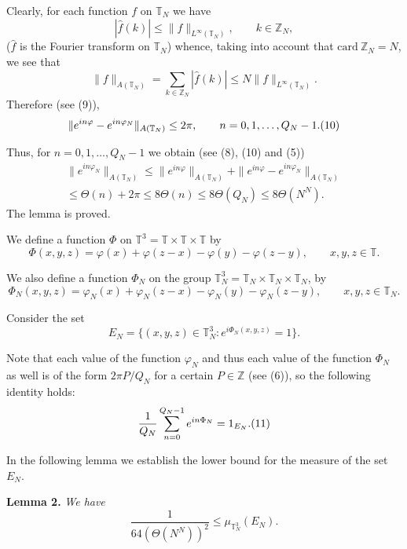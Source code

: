 \documentclass[12pt]{article}
\begin{document}
  Clearly, for each function $f$ on $\mathbb T_N$ we have
$$
|\widehat{f}(k)|\leq
\|f\|_{L^\infty(\mathbb T_N)}, \qquad k\in\mathbb Z_N,
$$
($\widehat{f}$ is the Fourier transform on $\mathbb T_N$) whence,
taking into account that $\mathrm{card}~\mathbb Z_N=N$, we see
that
$$
\|f\|_{A(\mathbb T_N)}=\sum_{k\in\mathbb Z_N}|\widehat{f}(k)|
\leq N \|f\|_{L^\infty(\mathbb T_N)}.
$$
Therefore (see (9)),
$$
\|e^{in\varphi}-e^{in\varphi_N}\|_{A(\mathbb T_N)}
\leq 2\pi, \qquad n=0, 1, \ldots, Q_N-1.
\relax(10)
$$

   Thus, for $n=0, 1, \ldots, Q_N-1$ we obtain
(see (8), (10) and (5))
\begin{multline*}
\|e^{in\varphi_N}\|_{A(\mathbb T_N)}\leq
\|e^{in\varphi}\|_{A(\mathbb T_N)}+
\|e^{in\varphi}-e^{in\varphi_N}\|_{A(\mathbb T_N)} \\ \leq
\Theta(n)+2\pi\leq 8\Theta(n)\leq 8\Theta(Q_N)\leq 8\Theta(N^N).
\end{multline*}
The lemma is proved.

\quad

  We define a function $\Phi$ on
$\mathbb T^3=\mathbb T\times\mathbb T\times\mathbb T$ by
$$
\Phi(x, y, z)=\varphi(x)+\varphi(z-x)-\varphi(y)-\varphi(z-y),
\qquad x, y, z\in \mathbb T.
$$

   We also define a function $\Phi_N$ on the group
$\mathbb T_N^3=\mathbb T_N\times\mathbb T_N\times\mathbb T_N$, by
$$
\Phi_N(x, y, z)=\varphi_N(x)+\varphi_N(z-x)-\varphi_N(y)-\varphi_N(z-y),
\qquad x, y, z \in\mathbb T_N.
$$

  Consider the set
$$
E_N=\{(x, y, z)\in\mathbb T_N^3 : e^{i\Phi_N(x, y, z)}=1\}.
$$

   Note that each value of the function $\varphi_N$ and thus
each value of the function $\Phi_N$ as well is of the form $2\pi
P/Q_N$ for a certain $P\in\mathbb Z$ (see (6)), so the following
identity holds:
$$
\frac{1}{Q_N}\sum_{n=0}^{Q_N-1}e^{in\Phi_N}=1_{E_N}.
\relax(11)
$$

  In the following lemma we establish the lower bound
for the measure of the set $E_N$.

\quad

\textbf{Lemma 2.} \emph{We have}
$$
\frac{1}{64(\Theta(N^N))^2}\leq \mu_{\mathbb T_N^3} (E_N).
$$

\quad
\end{document}
